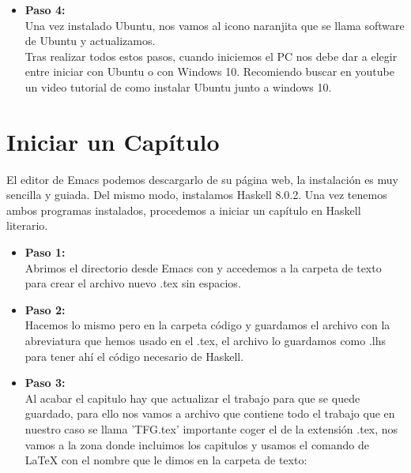 \begin{itemize}
\item \textbf{Paso 4:}\\
Una vez instalado Ubuntu, nos vamos al icono naranjita que se llama software de Ubuntu y actualizamos.\\

Tras realizar todos estos pasos, cuando iniciemos el PC nos debe dar a elegir entre iniciar con Ubuntu o con Windows 10. Recomiendo buscar en youtube un video tutorial de como instalar Ubuntu junto a windows 10.\\
\end{itemize}

\section{Iniciar un Capítulo}

El editor de Emacs podemos descargarlo de su página web, la instalación es muy sencilla y guiada. Del mismo modo, instalamos Haskell 8.0.2. Una vez tenemos ambos programas instalados, procedemos a iniciar un capítulo en Haskell literario.
\begin{itemize}

\item \textbf{Paso 1:}\\
Abrimos el directorio desde Emacs con  y accedemos a la carpeta de texto para crear el archivo nuevo .tex sin espacios.\\

\item \textbf{Paso 2:}\\
Hacemos lo mismo pero en la carpeta código y guardamos el archivo con la abreviatura que hemos usado en el .tex, el archivo lo guardamos como .lhs para tener ahí el código necesario de Haskell. \\

\item \textbf{Paso 3:}\\
Al acabar el capitulo hay que actualizar el trabajo para que se quede guardado, para ello nos vamos a archivo que contiene todo el trabajo que en nuestro caso se llama 'TFG.tex' importante coger el de la extensión .tex, nos vamos a la zona donde incluimos los capitulos y usamos el comando de LaTeX con el nombre que le dimos en la carpeta de texto:\\

\\

\end{itemize}


